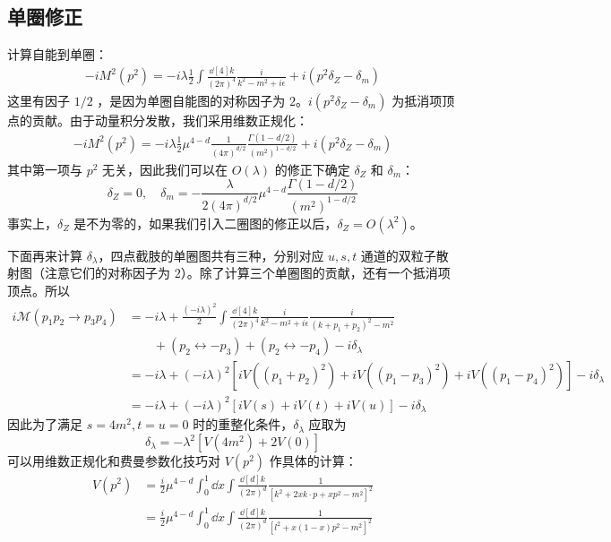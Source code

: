\subsection{单圈修正}
计算自能到单圈：
\begin{equation}
\begin{aligned}
-iM^2(p^2)=-i\lambda \frac{1}{2}\int \frac{\dd[4]{k}}{(2\pi)^4} \frac{i}{k^2-m^2+i\epsilon} + i(p^2\delta_Z-\delta_m)
\end{aligned}
\end{equation}
这里有因子 $1/2$ ，是因为单圈自能图的对称因子为 $2$。$i(p^2\delta_Z-\delta_m)$ 为抵消项顶点的贡献。由于动量积分发散，我们采用维数正规化：
\begin{equation}
\begin{aligned}
-iM^2(p^2)=-i\lambda \frac{1}{2} \mu^{4-d}\frac{1}{(4\pi)^{d/2}}\frac{\Gamma(1-d/2)}{(m^2)^{1-d/2}} + i(p^2\delta_Z-\delta_m)
\end{aligned}
\end{equation}
其中第一项与 $p^2$ 无关，因此我们可以在 $O(\lambda)$ 的修正下确定 $\delta_Z$ 和 $\delta_m$：
\begin{equation}
\delta_Z = 0,\quad \delta_m = -\frac{\lambda}{2(4\pi)^{d/2}}\mu^{4-d} \frac{\Gamma(1-d/2)}{(m^2)^{1-d/2}}
\end{equation}
事实上，$\delta_Z$ 是不为零的，如果我们引入二圈图的修正以后，$\delta_Z=O(\lambda^2)$。

下面再来计算 $\delta_\lambda$，四点截肢的单圈图共有三种，分别对应 $u,s,t$ 通道的双粒子散射图（注意它们的对称因子为 $2$）。除了计算三个单圈图的贡献，还有一个抵消项顶点。所以
\begin{equation}
\begin{aligned}
i\mathcal{M}(p_1p_2\rightarrow p_3p_4) &= -i\lambda + \frac{(-i\lambda)^2}{2} \int \frac{\dd[4]{k}}{(2\pi)^4} \frac{i}{k^2-m^2+i\epsilon} \frac{i}{(k+p_1+p_2)^2-m^2}\\
&\quad\quad + (p_2\leftrightarrow -p_3)+(p_2\leftrightarrow -p_4)-i\delta_\lambda\\
&=-i\lambda + (-i\lambda)^2 [iV((p_1+p_2)^2)+iV((p_1-p_3)^2)+iV((p_1-p_4)^2)]-i\delta_\lambda\\
&=-i\lambda + (-i\lambda)^2 [iV(s)+iV(t)+iV(u)]-i\delta_\lambda
\end{aligned}
\end{equation}
因此为了满足 $s=4m^2,t=u=0$ 时的重整化条件，$\delta_\lambda$ 应取为
\begin{equation}
\delta_\lambda = -\lambda^2[V(4m^2)+2V(0)]
\end{equation}
可以用维数正规化和费曼参数化技巧对 $V(p^2)$ 作具体的计算：
\begin{equation}
\begin{aligned}
V(p^2)&=\frac{i}{2}\mu^{4-d}\int_0^1 \dd x \int \frac{\dd[d]{k}}{(2\pi)^d} \frac{1}{[k^2+2xk\cdot p+xp^2-m^2]^2}\\
&=\frac{i}{2}\mu^{4-d}\int_0^1 \dd x \int \frac{\dd[d]{k}}{(2\pi)^d} \frac{1}{[l^2+x(1-x)p^2-m^2]^2}
\end{aligned}
\end{equation}

